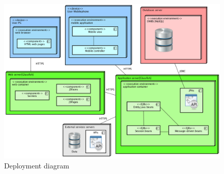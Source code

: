 \begin{figure}
	\centering
	\includegraphics[width=1.3\textwidth]{images/deploymentdiagram}
	\caption{Deployment diagram}
	
	\label{fig:deploymentdiagram}
\end{figure}
